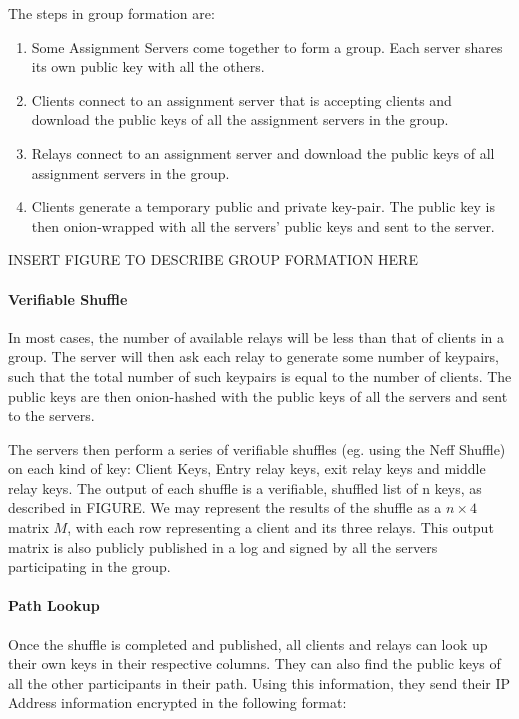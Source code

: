 The steps in group formation are: 
\begin{enumerate} 
\item Some Assignment Servers come together to form a group. Each server shares 
its own public key with all the others. 
\item Clients connect to an assignment server that is accepting clients and 
download the public keys of all the assignment servers in the group.
\item Relays connect to an assignment server and download the public
keys of all assignment servers in the group. 
\item Clients generate a temporary public and private key-pair. The public key 
is then onion-wrapped with all the servers' public keys and sent to the server.
\end{enumerate}

INSERT FIGURE TO DESCRIBE GROUP FORMATION HERE

\paragraph{Verifiable Shuffle} 
In most cases, the number of available relays will be less than that of clients 
in a group. The server will then ask each relay to generate some number of 
keypairs, such that the total number of such keypairs is equal to the number of 
clients. The public keys are then onion-hashed with the public keys of all the 
servers and sent to the servers.

The servers then perform a series of verifiable shuffles (eg. using the Neff
Shuffle) on each kind of key: Client Keys, Entry relay keys, exit relay keys and 
middle relay keys. The output of each shuffle is a verifiable, shuffled list of 
n keys, as described in FIGURE. 
We may represent the results of the shuffle as a $n \times 4$ matrix $M$, with 
each row representing a client and its three relays. This output matrix is also 
publicly published in a log and signed by all the servers participating in the 
group.

\paragraph{Path Lookup}
Once the shuffle is completed and published, all clients and relays can look up
their own keys in their respective columns. They can also find the public keys 
of all the other participants in their path. Using this information, they send 
their IP Address information encrypted in the following format:

